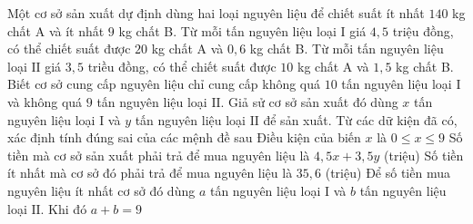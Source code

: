 \begin{ex} %
	Một cơ sở sản xuất dự định dùng hai loại nguyên liệu để chiết suất ít nhất $140$ kg chất A và ít nhất $9$ kg chất B. Từ mỗi tấn nguyên liệu loại $\text{I}$ giá $4{,}5$ triệu đồng, có thể chiết suất được $20$ kg chất A và $0{,}6$ kg chất B. Từ mỗi tấn nguyên liệu loại $\text{II}$ giá $3{,}5$ triều đồng, có thể chiết suất được $10$ kg chất A và $1{,}5$ kg chất B. Biết cơ sở cung cấp nguyên liệu chỉ cung cấp không quá $10$ tấn nguyên liệu loại $\text{I}$ và không quá $9$ tấn nguyên liệu loại $\text{II}$. Giả sử cơ sở sản xuất đó dùng $x$ tấn nguyên liệu loại $\text{I}$ và $y$ tấn nguyên liệu loại $\text{II}$ để sản xuất. Từ các dữ kiện đã có, xác định tính đúng sai của các mệnh đề sau
	\choiceTF
	{Điều kiện của biến $x$ là $0 \leq x \leq 9$}
	{\True Số tiền mà cơ sở sản xuất phải trả để mua nguyên liệu là $4{,}5 x+3{,}5 y$ (triệu)}
	{Số tiền ít nhất mà cơ sở đó phải trả để mua nguyên liệu là $35{,}6$ (triệu)}
	{\True Để số tiền mua nguyên liệu ít nhất cơ sở đó dùng $a$ tấn nguyên liệu loại $\text{I}$ và $b$ tấn nguyên liệu loại $\text{II}$. Khi đó $a+b=9$}
	\loigiai{
		
}
\end{ex}
